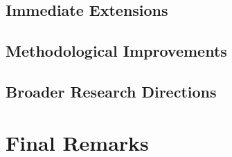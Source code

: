 \subsection{Immediate Extensions}

\subsection{Methodological Improvements}

\subsection{Broader Research Directions}

\section{Final Remarks}

